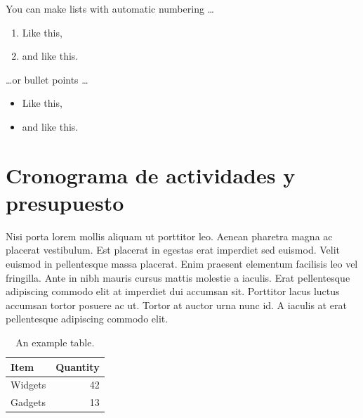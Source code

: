 You can make lists with automatic numbering \dots

\begin{enumerate}
	\item Like this,
	\item and like this.
\end{enumerate}
\dots or bullet points \dots
\begin{itemize}
	\item Like this,
	\item and like this.
\end{itemize}


\section{Cronograma de actividades y presupuesto}
Nisi porta lorem mollis aliquam ut porttitor leo. Aenean pharetra magna ac placerat vestibulum. Est placerat in egestas erat imperdiet sed euismod. Velit euismod in pellentesque massa placerat. Enim praesent elementum facilisis leo vel fringilla. Ante in nibh mauris cursus mattis molestie a iaculis. Erat pellentesque adipiscing commodo elit at imperdiet dui accumsan sit. Porttitor lacus luctus accumsan tortor posuere ac ut. Tortor at auctor urna nunc id. A iaculis at erat pellentesque adipiscing commodo elit.

\begin{table}[h]
	\centering
	\begin{tabular}{l|r}
		Item & Quantity \\\hline
		Widgets & 42 \\
		Gadgets & 13
	\end{tabular}
	\caption{\label{tab:widgets}An example table.}
\end{table}